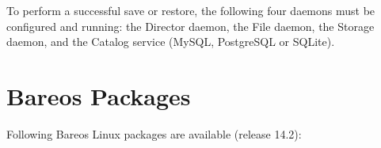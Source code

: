 To perform a successful save or restore, the following four daemons must be
configured and running: the Director daemon, the File daemon, the Storage
daemon, and the Catalog service (MySQL, PostgreSQL or SQLite).


\section{Bareos Packages}
    \label{sec:BareosPackages}

Following Bareos Linux packages are available (release 14.2):

